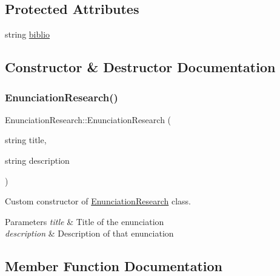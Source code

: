 \subsection*{Protected Attributes}
\begin{DoxyCompactItemize}
\item 
string \hyperlink{class_enunciation_research_a425da04eb657de83211819d1af3fc640}{biblio}
\end{DoxyCompactItemize}


\subsection{Constructor \& Destructor Documentation}
\mbox{\label{class_enunciation_research_ac5d9450c0cdd0c2682e7b2ba35ca1258}} 
\subsubsection{\texorpdfstring{Enunciation\+Research()}{EnunciationResearch()}}
{\footnotesize\ttfamily Enunciation\+Research\+::\+Enunciation\+Research (\begin{DoxyParamCaption}\item[{string}]{title,  }\item[{string}]{description }\end{DoxyParamCaption})}



Custom constructor of \hyperlink{class_enunciation_research}{Enunciation\+Research} class. 


\begin{DoxyParams}{Parameters}
{\em title} & Title of the enunciation \\
\hline
{\em description} & Description of that enunciation \\
\hline
\end{DoxyParams}


\subsection{Member Function Documentation}
\mbox{\label{class_enunciation_research_ad5021c15b3cf600191d21aec467529d4}} 
